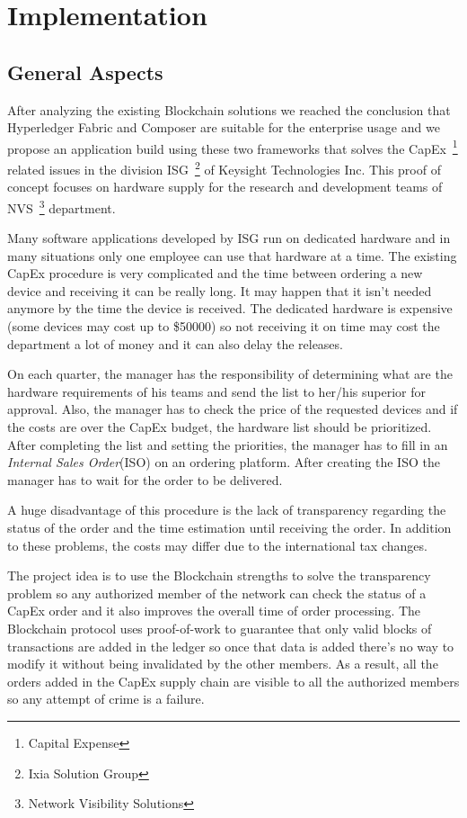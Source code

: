 \chapter{Implementation}
\label{chapter:chapter3}

\section{General Aspects}
\label{sec:chapter3-section1}
After analyzing the existing Blockchain solutions we reached the conclusion that Hyperledger Fabric and Composer are suitable for the enterprise usage and we propose an application build using these two frameworks that solves the CapEx~\footnote{Capital Expense} related issues in the division ISG~\footnote{Ixia Solution Group} of Keysight Technologies Inc. This proof of concept focuses on hardware supply for the research and development teams of NVS~\footnote{Network Visibility Solutions} department.

Many software applications developed by ISG run on dedicated hardware and in many situations only one employee can use that hardware at a time.
The existing CapEx procedure is very complicated and the time between ordering a new device and receiving it can be really long. It may happen that it isn't needed anymore by the time the device is received. The dedicated hardware is expensive (some devices may cost up to \$50000) so not receiving it on time may cost the department a lot of money and it can also delay the releases.

On each quarter, the manager has the responsibility of determining what are the hardware requirements of his teams and send the list to her/his superior for approval.
Also, the manager has to check the price of the requested devices and if the costs are over the CapEx budget, the hardware list should be prioritized. 
After completing the list and setting the priorities, the manager has to fill in an \emph{Internal Sales Order}(ISO) on an ordering platform. After creating the ISO the manager has to wait for the order to be delivered.

A huge disadvantage of this procedure is the lack of transparency regarding the status of the order and the time estimation until receiving the order.
In addition to these problems, the costs may differ due to the international tax changes. 

The project idea is to use the Blockchain strengths to solve the transparency problem so any authorized member of  the network can check the status of a CapEx order and it also improves the overall time of order processing.
The Blockchain protocol uses proof-of-work to guarantee that only valid blocks of transactions are added in the ledger so once that data is added there's no way to modify it without being invalidated by the other members.
As a result, all the orders added in the CapEx supply chain are visible to all the authorized members so any attempt of crime is a failure.

